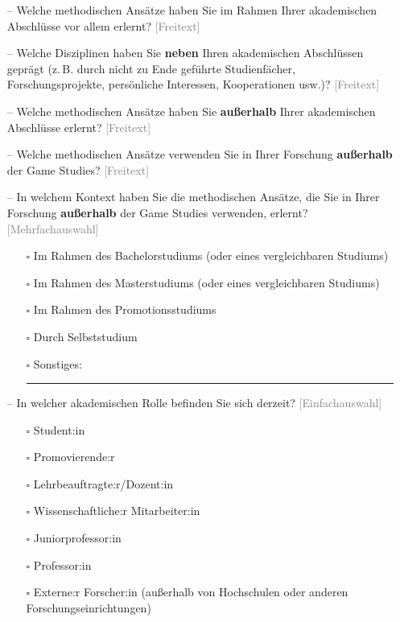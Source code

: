 \documentclass{scrartcl}
\begin{document}
\begin{itemize}
   \item[--] Welche methodischen Ansätze haben Sie im Rahmen Ihrer akademischen Abschlüsse vor allem erlernt? \textcolor{gray}{\textsf{[Freitext]}}
   \item[--] Welche Disziplinen haben Sie \textbf{neben} Ihren akademischen Abschlüssen geprägt (z.\,B. durch nicht zu Ende geführte Studienfächer, Forschungsprojekte, persönliche Interessen, Kooperationen usw.)? \textcolor{gray}{\textsf{[Freitext]}}
   \item[--] Welche methodischen Ansätze haben Sie \textbf{außerhalb} Ihrer akademischen Abschlüsse erlernt? \textcolor{gray}{\textsf{[Freitext]}}
   \item[--] Welche methodischen Ansätze verwenden Sie in Ihrer Forschung \textbf{außerhalb} der Game Studies? \textcolor{gray}{\textsf{[Freitext]}}
   \item[--] In welchem Kontext haben Sie die methodischen Ansätze, die Sie in Ihrer Forschung \textbf{außerhalb} der Game Studies verwenden, erlernt? \textcolor{gray}{\textsf{[Mehrfachauswahl]}}
   \begin{itemize}
      \item[$\square$] Im Rahmen des Bachelorstudiums (oder eines vergleichbaren Studiums)
      \item[$\square$] Im Rahmen des Masterstudiums (oder eines vergleichbaren Studiums)
      \item[$\square$] Im Rahmen des Promotionsstudiums
      \item[$\square$] Durch Selbststudium
      \item[$\square$] Sonstiges:\ \rule{2cm}{0.4pt}
   \end{itemize}
   \item[--] In welcher akademischen Rolle befinden Sie sich derzeit? \textcolor{gray}{\textsf{[Einfachauswahl]}}
   \begin{itemize}
      \item[$\square$] Student:in
      \item[$\square$] Promovierende:r
      \item[$\square$] Lehrbeauftragte:r/Dozent:in
      \item[$\square$] Wissenschaftliche:r Mitarbeiter:in
      \item[$\square$] Juniorprofessor:in
      \item[$\square$] Professor:in
      \item[$\square$] Externe:r Forscher:in (außerhalb von Hochschulen oder anderen Forschungseinrichtungen)

\end{itemize}
\end{itemize}
\end{document}
